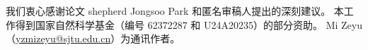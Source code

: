 \begin{acks}
我们衷心感谢论文 shepherd Jongsoo Park 和匿名审稿人提出的深刻建议。
本工作得到国家自然科学基金（编号 62372287 和 U24A20235）的部分资助。
Mi Zeyu（\href{mailto:yzmizeyu@sjtu.edu.cn}{yzmizeyu@sjtu.edu.cn}）为通讯作者。
\end{acks}
